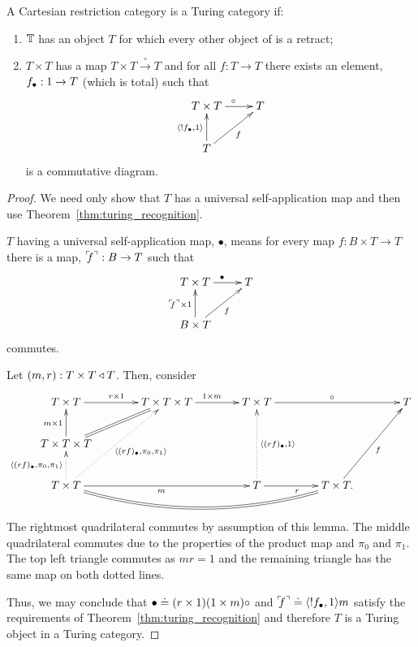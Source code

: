 \begin{lemma}\label{lem:t_t_to_t_gives_a_turing_category}
  A Cartesian restriction category \T is a Turing category if:
  \begin{enumerate}[{(}i{)}]
  \item $\mathbb{T}$ has an object $T$ for which every other object of \D is a retract;
  \item $T\times T$ has a map  $T\times T \xrightarrow{\ \circ\ }T$ and for all
    $f:T\to T$ there exists an element, $f_{\bullet}:1\to T$ (which is total) such that
      \[
        \xymatrix{
          T\times T \ar[r]^{\circ} & T \\
          T \ar[ur]_{f} \ar[u]^{\<!\code{f},1\>}
        }
      \]
    is a commutative diagram.
  \end{enumerate}
\end{lemma}
\begin{proof}
  We need only show that $T$ has a universal self-application map and then use
  Theorem~\ref{thm:turing_recognition}.

  $T$ having a universal self-application map, $\bullet$, means for every map $f:B\times T \to T$ there is a
  map, ${}^\ulcorner\!\!f^\urcorner:B\to T$ such that
  \[
    \xymatrix{
      T\times T \ar[r]^{\bullet} & T \\
      B\times T \ar[ur]_{f} \ar[u]^{\name{f}\times1}
    }
  \]
  commutes.

  Let $(m,r):T\times T\triangleleft T$. Then, consider
  \[
    \xymatrix@C+15pt{
     T\times T \ar[r]^{r\times 1} & T\times T\times T \ar[r]^{1\times m} &T\times T \ar[rr]^{\circ}
       && T \\
     T\times T\times T \ar[u]^{m\times 1} \ar@{=}[ur]\\
     T\times T \ar@{.>}[u]^{\<\code{(r f)},\pi_0,\pi_1\>} \ar@{.>}[uur]_{\<\code{(r f)},\pi_0,\pi_1\>}
       \ar[rr]_{m} \ar@{=}@/_20pt/[rrr]
       & & T \ar[r]_{r} \ar@{.>}[uu]_{\<\code{(r f)},1\>} &T\times T. \ar[uur]_{f}
    }
  \]
  \\[10pt]
  The rightmost quadrilateral commutes by assumption of this lemma. The middle quadrilateral
  commutes due to the properties of the product map and $\pi_0$ and $\pi_1$. The top left triangle
  commutes as $m r = 1$ and the remaining triangle has the same map on both dotted lines.

  Thus, we may conclude that $\bullet \doteq (r \times 1)(1\times m) \circ$ and
  ${}^\ulcorner\!\!f^\urcorner\doteq \langle!f_{\bullet},1\rangle m$ satisfy the requirements of
  Theorem~\ref{thm:turing_recognition} and therefore $T$ is a Turing object in a Turing category.
\end{proof}
